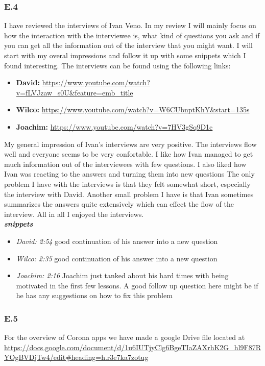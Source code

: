\documentclass[]{article}
\begin{document}
\subsubsection*{E.4}
I have reviewed the interviews of Ivan Veno. In my review I will mainly focus 
on how the interaction with the interviewee is, what kind of questions you ask 
and if you can get all the information out of the interview that you might want. 
I will start with my overal impressions and follow it up with some snippets which 
I found interesting. The interviews can be found using the following links:
\begin{itemize}
    \item[] \textbf{David: } \url{https://www.youtube.com/watch?v=fLVJzaw_s0U&feature=emb_title}
    \item[] \textbf{Wilco: } \url{https://www.youtube.com/watch?v=W6CUbnptKhY&start=135s}
    \item[] \textbf{Joachim: } \url{https://www.youtube.com/watch?v=7HV3gSq9D1c}
\end{itemize}
My general impression of Ivan's interviews are very positive. The interviews
flow well and everyone seems to be very confortable. I like how Ivan managed 
to get much information out of the interviewees with few questions. 
I also liked how Ivan was reacting to the answers and turning them into new questions
The only problem I have with the interviews is that they felt somewhat short, especially the interview with David. 
Another small problem I have is that Ivan sometimes summarizes the answers quite extensively which can effect the flow of the interview.
All in all I enjoyed the interviews.\\
\textbf{\textit{snippets}}
\begin{itemize}
    \item [] \textit{David: 2:54} good continuation of his answer into a new question
    \item [] \textit{Wilco: 2:35} good continuation of his answer into a new question
    \item [] \textit{Joachim: 2:16} Joachim just tanked about his hard times with being motivated 
                in the first few lessons. A good follow up question here might be if he has any suggestions
                on how to fix this problem
\end{itemize} 

\subsubsection*{E.5}
For the overview of Corona apps we have made a google Drive file located at
\url{https://docs.google.com/document/d/1u6IUTjyClg6BgeTIaZAXrhK2G_hl9F87RYOgBVDjTw4/edit#heading=h.r3e7ka7zotug}


\printbibliography
\end{document}
